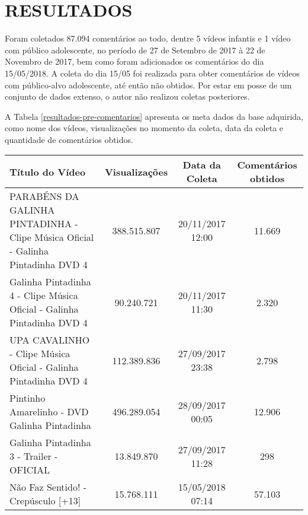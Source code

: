 \newpage
\section{RESULTADOS}

Foram coletados 87.094 comentários ao todo, dentre 5 vídeos infantis e 1 vídeo com público adolescente, no período de 27 de Setembro de 2017 à 22 de Novembro de 2017, bem como foram adicionados os comentários do dia 15/05/2018. 
A coleta do dia 15/05 foi realizada para obter comentários de vídeos com público-alvo adolescente, até então não obtidos. Por estar em posse de um conjunto de dados extenso, o autor não realizou coletas posteriores. %

A Tabela \ref{resultados-pre-comentarios} apresenta os meta dados da base adquirida, como nome dos vídeos,  visualizações no momento da coleta, data da coleta e quantidade de comentários obtidos.

\begin{table}[H]
\begin{tabular}{|p{5.5cm}|c|c|c|}
\hline
\textbf{Título do Vídeo} & \textbf{Visualizações} & \textbf{Data da Coleta} & \textbf{Comentários obtidos} \\ \hline
PARABÉNS DA GALINHA PINTADINHA - Clipe Música Oficial - Galinha Pintadinha DVD 4 & 388.515.807 & 20/11/2017 12:00 & 11.669 \\ \hline
Galinha Pintadinha 4 - Clipe Música Oficial - Galinha Pintadinha DVD 4 & 90.240.721 & 20/11/2017 11:30 & 2.320 \\ \hline
UPA CAVALINHO - Clipe Música Oficial - Galinha Pintadinha DVD 4 & 112.389.836 & 27/09/2017 23:38 & 2.798 \\ \hline
Pintinho Amarelinho - DVD Galinha Pintadinha & 496.289.054 & 28/09/2017 00:05 & 12.906 \\ \hline
Galinha Pintadinha 3 - Trailer - OFICIAL & 13.849.870 & 27/09/2017 11:28 & 298 \\ \hline
Não Faz Sentido! - Crepúsculo [+13] & 15.768.111 & 15/05/2018 07:14 & 57.103 \\ \hline
\end{tabular}

\end{table}

